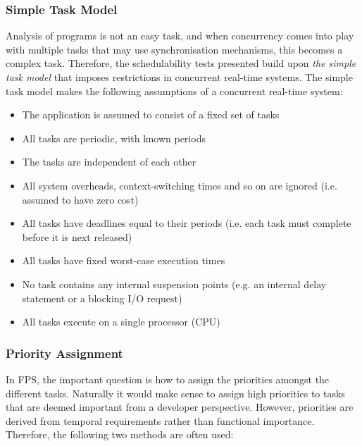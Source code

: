 \subsubsection{Simple Task Model}
Analysis of programs is not an easy task, and when concurrency comes into play with multiple tasks that may use synchronisation mechanisms, this becomes a complex task. Therefore, the schedulability tests presented build upon \textit{the simple task model} that imposes restrictions in concurrent real-time systems. The simple task model makes the following assumptions of a concurrent real-time system:

\begin{itemize}
	\item The application is assumed to consist of a fixed set of tasks
	\item All tasks are periodic, with known periods
	\item The tasks are independent of each other
	\item All system overheads, context-switching times and so on are ignored (i.e. assumed to have zero cost)
	\item All tasks have deadlines equal to their periods (i.e. each task must complete before it is next released)
	\item All tasks have fixed worst-case execution times
	\item No task contains any internal suspension points (e.g. an internal delay statement or a blocking I/O request)
	\item All tasks execute on a single processor (CPU)
\end{itemize}

\subsubsection{Priority Assignment}
In FPS, the important question is how to assign the priorities amongst the different tasks. Naturally it would make sense to assign high priorities to tasks that are deemed important from a developer perspective. However, priorities are derived from temporal requirements rather than functional importance. Therefore, the following two methods are often used:

